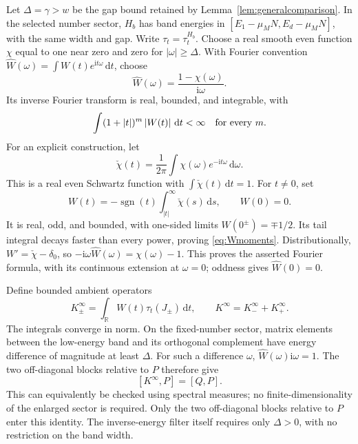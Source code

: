 \documentclass[11pt]{article}
\theoremstyle{definition}
\theoremstyle{remark}
\newcommand{\ii}{\mathrm i}
\newcommand{\dd}{\,\mathrm d}
\newcommand{\abs}[1]{\left|#1\right|}
\begin{document}
Let \(\Delta=\gamma>w\) be the gap bound retained by
Lemma~\ref{lem:generalcomparison}.  In the selected number sector,
\(H_b\) has band energies in \([E_1-\mu_MN,E_d-\mu_MN]\),
with the same width and gap.  Write \(\tau_t=\tau_t^{H_b}\).
Choose a real smooth even function \(\chi\) equal to one near
zero and zero for \(\abs\omega\ge\Delta\).
With Fourier convention
\(\widehat W(\omega)=\int W(t)e^{\ii t\omega}\dd t\), choose
\[
 \widehat W(\omega)=\frac{1-\chi(\omega)}{\ii\omega}.
\]
Its inverse Fourier transform is real, bounded, and integrable,
with
\begin{equation}\label{eq:Wmoments}
 \int(1+\abs t)^m\abs{W(t)}\dd t<\infty
 \quad\hbox{for every }m.
\end{equation}
For an explicit construction, let
\[
 \check\chi(t)=\frac1{2\pi}\int\chi(\omega)e^{-\ii t\omega}\dd\omega.
\]
This is a real even Schwartz function with
\(\int\check\chi(t)\dd t=1\).
For \(t\ne0\), set
\begin{equation}\label{eq:Wexplicit}
 W(t)=-\operatorname{sgn}(t)\int_{\abs t}^{\infty}\check\chi(s)\dd s,
 \qquad W(0)=0.
\end{equation}
It is real, odd, and bounded, with one-sided limits
\(W(0^\pm)=\mp1/2\).  Its tail integral decays faster than
every power, proving \eqref{eq:Wmoments}.  Distributionally,
\(W'=\check\chi-\delta_0\), so
\(-\ii\omega\widehat W(\omega)=\chi(\omega)-1\).
This proves the asserted Fourier formula, with its continuous
extension at \(\omega=0\); oddness gives \(\widehat W(0)=0\).

Define bounded ambient operators
\[
 K_\pm^\infty=\int_{\mathbb R}W(t)\tau_t(J_\pm)\dd t,\qquad
 K^\infty=K_-^\infty+K_+^\infty.
\]
The integrals converge in norm.  On the fixed-number sector,
matrix elements between the low-energy band and its orthogonal
complement have energy difference of magnitude at least \(\Delta\).
For such a difference \(\omega\),
\(\widehat W(\omega)\ii\omega=1\).
The two off-diagonal blocks relative to \(P\) therefore give
\begin{equation}\label{eq:dressingexact}
 [K^\infty,P]=[Q,P].
\end{equation}
This can equivalently be checked using spectral measures;
no finite-dimensionality of the enlarged sector is required.
Only the two off-diagonal blocks relative to \(P\) enter this
identity.  The inverse-energy filter itself requires only
\(\Delta>0\), with no restriction on the band width.
\end{document}
